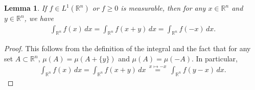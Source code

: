 \documentclass[11pt]{book}
\newtheorem{lemma}{Lemma}[chapter]
\theoremstyle{definition}
\numberwithin{equation}{chapter}
\begin{document}
\medskip

\begin{lemma}\label{lemma_41}
If $f \in L^1(\mathbb{R}^n)$ or $f \geq 0$ is measurable, then for any $x \in \mathbb{R}^n$ and $y \in \mathbb{R}^n$, we have
\begin{align*}
    \int_{\mathbb{R}^n} f(x) \,dx = \int_{\mathbb{R}^n} f(x + y) \,dx = \int_{\mathbb{R}^n} f(-x) \,dx.
\end{align*}
\end{lemma}
\begin{proof}
This follows from the definition of the integral and the fact that for any set $A \subset \mathbb{R}^n$, $\mu(A) = \mu(A + \{y\})$ and $\mu(A) = \mu(-A)$. In particular, 
\begin{align*}
    \int_{\mathbb{R}^n} f(x) \,dx = \int_{\mathbb{R}^n} f(x + y) \,dx \, \overset{x \mapsto -x}{=}\, \int_{\mathbb{R}^n} f(y - x) \,dx. 
\end{align*}
\end{proof}

\medskip
\end{document}
